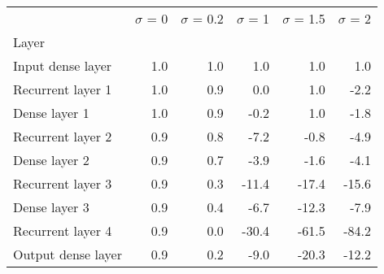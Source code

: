 \begin{tabular}{lrrrrr}
\toprule
{} &  $\sigma$  = 0 &  $\sigma$  = 0.2 &  $\sigma$  = 1 &  $\sigma$  = 1.5 &  $\sigma$  = 2 \\
Layer              &                &                  &                &                  &                \\
\midrule
Input dense layer  &            1.0 &              1.0 &            1.0 &              1.0 &            1.0 \\
Recurrent layer 1  &            1.0 &              0.9 &            0.0 &              1.0 &           -2.2 \\
Dense layer 1      &            1.0 &              0.9 &           -0.2 &              1.0 &           -1.8 \\
Recurrent layer 2  &            0.9 &              0.8 &           -7.2 &             -0.8 &           -4.9 \\
Dense layer 2      &            0.9 &              0.7 &           -3.9 &             -1.6 &           -4.1 \\
Recurrent layer 3  &            0.9 &              0.3 &          -11.4 &            -17.4 &          -15.6 \\
Dense layer 3      &            0.9 &              0.4 &           -6.7 &            -12.3 &           -7.9 \\
Recurrent layer 4  &            0.9 &              0.0 &          -30.4 &            -61.5 &          -84.2 \\
Output dense layer &            0.9 &              0.2 &           -9.0 &            -20.3 &          -12.2 \\
\bottomrule
\end{tabular}
